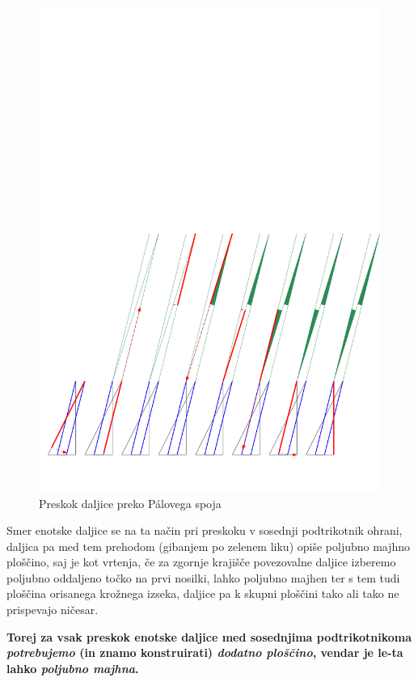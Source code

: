 \documentclass[a4paper, 12pt]{article}
\begin{document}
\begin{figure}[h!]
    \centering
    \includegraphics[width=\textwidth]{ipe_slike/pal.pdf}
    \caption{Preskok daljice preko Pálovega spoja}
    \label{pal}
\end{figure}

Smer enotske daljice se na ta način pri preskoku v sosednji podtrikotnik ohrani, daljica pa med tem prehodom (gibanjem po zelenem liku) opiše poljubno majhno ploščino, saj je kot vrtenja, če za zgornje krajišče povezovalne daljice izberemo poljubno oddaljeno točko na prvi nosilki, lahko poljubno majhen ter s tem tudi ploščina orisanega krožnega izseka, daljice pa k skupni ploščini tako ali tako ne prispevajo ničesar.

\textbf{Torej za vsak preskok enotske daljice med sosednjima podtrikotnikoma \emph{potrebujemo} (in znamo konstruirati) \emph{dodatno ploščino}, vendar je le-ta lahko \emph{poljubno majhna}.}
\end{document}
